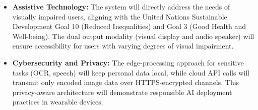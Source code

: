 \begin{itemize}[leftmargin=1.5cm]
\item \textbf{Assistive Technology:} The system will directly address the needs of visually impaired users, aligning with the United Nations Sustainable Development Goal 10 (Reduced Inequalities) and Goal 3 (Good Health and Well-being). The dual output modality (visual display and audio speaker) will ensure accessibility for users with varying degrees of visual impairment.

\item \textbf{Cybersecurity and Privacy:} The edge-processing approach for sensitive tasks (OCR, speech) will keep personal data local, while cloud API calls will transmit only encoded image data over HTTPS-encrypted channels. This privacy-aware architecture will demonstrate responsible AI deployment practices in wearable devices.
\end{itemize}
